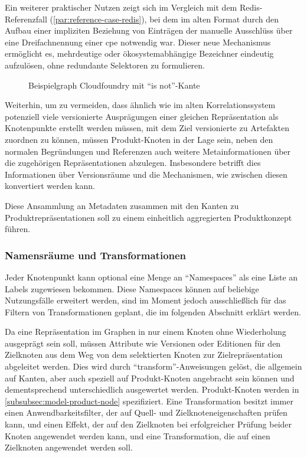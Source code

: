 Ein weiterer praktischer Nutzen zeigt sich im Vergleich mit dem Redis-Referenzfall (\autoref{par:reference-case-redis}), bei dem im alten Format durch den Aufbau einer impliziten Beziehung von Einträgen der manuelle Ausschlüss über eine Dreifachnennung einer \acrshort{cpe} notwendig war.
Dieser neue Mechanismus ermöglicht es, mehrdeutige oder ökosystemabhängige Bezeichner eindeutig aufzulösen, ohne redundante Selektoren zu formulieren.

\begin{figure}[htbp]
    \centering
    \makebox[\textwidth]{}
    \caption{Beispielgraph Cloudfoundry mit \enquote{is not}-Kante}
    \label{fig:example-graph-cloudfoundry}
\end{figure}

Weiterhin, um zu vermeiden, dass ähnlich wie im alten Korrelationssystem potenziell viele versionierte Ausprägungen einer gleichen Repräsentation als Knotenpunkte erstellt werden müssen, mit dem Ziel versionierte  zu Artefakten zuordnen zu können, müssen Produkt-Knoten in der Lage sein, neben den normalen Begründungen und Referenzen auch weitere Metainformationen über die zugehörigen Repräsentationen abzulegen.
Insbesondere betrifft dies Informationen über Versionsräume und die Mechanismen, wie zwischen diesen konvertiert werden kann.

Diese Ansammlung an Metadaten zusammen mit den Kanten zu Produktrepräsentationen soll zu einem einheitlich aggregierten Produktkonzept führen.

\subsubsection{Namensräume und Transformationen}\label{subsubsec:model-namespaces-transformations}

Jeder Knotenpunkt kann optional eine Menge an \enquote{Namespaces} als eine Liste an Labels zugewiesen bekommen.
Diese Namespaces können auf beliebige Nutzungsfälle erweitert werden, sind im Moment jedoch ausschließlich für das Filtern von Transformationen geplant, die im folgenden Abschnitt erklärt werden.

Da eine Repräsentation im Graphen in nur einem Knoten ohne Wiederholung ausgeprägt sein soll, müssen Attribute wie Versionen oder Editionen für den Zielknoten aus dem Weg von dem selektierten Knoten zur Zielrepräsentation abgeleitet werden.
Dies wird durch \enquote{transform}-Anweisungen gelöst, die allgemein auf Kanten, aber auch speziell auf Produkt-Knoten angebracht sein können und dementsprechend unterschiedlich ausgewertet werden.
Produkt-Knoten werden in \autoref{subsubsec:model-product-node} spezifiziert.
Eine Transformation besitzt immer einen Anwendbarkeitsfilter, der auf Quell- und Zielknoteneigenschaften prüfen kann, und einen Effekt, der auf den Zielknoten bei erfolgreicher Prüfung beider Knoten angewendet werden kann, und eine Transformation, die auf einen Zielknoten angewendet werden soll.

